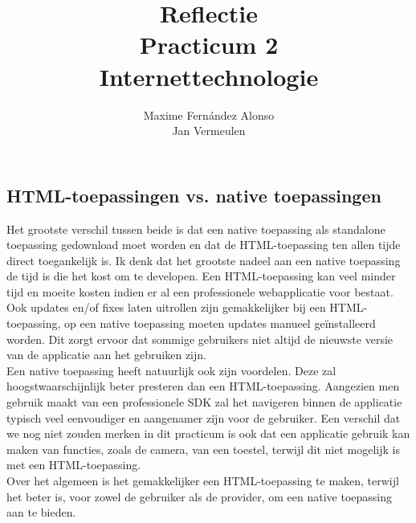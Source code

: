 \documentclass[a4paper,11pt]{article}
\begin{document}

\title{Reflectie\\Practicum 2\\Internettechnologie}
\author{Maxime Fern\'andez Alonso\\Jan Vermeulen}
\date{}
\maketitle


\subsection*{HTML-toepassingen vs. native toepassingen}
Het grootste verschil tussen beide is dat een native toepassing als standalone toepassing gedownload moet worden en dat de HTML-toepassing ten allen tijde direct toegankelijk is. Ik denk dat het grootste nadeel aan een native toepassing de tijd is die het kost om te developen. Een HTML-toepassing kan veel minder tijd en moeite kosten indien er al een professionele webapplicatie voor bestaat. Ook updates en/of fixes laten uitrollen zijn gemakkelijker bij een HTML-toepassing, op een native toepassing moeten updates manueel ge\"installeerd worden. Dit zorgt ervoor dat sommige gebruikers niet altijd de nieuwste versie van de applicatie aan het gebruiken zijn.\\
Een native toepassing heeft natuurlijk ook zijn voordelen. Deze zal hoogstwaarschijnlijk beter presteren dan een HTML-toepassing. Aangezien men gebruik maakt van een professionele SDK zal het navigeren binnen de applicatie typisch veel eenvoudiger en aangenamer zijn voor de gebruiker. Een verschil dat we nog niet zouden merken in dit practicum is ook dat een applicatie gebruik kan maken van functies, zoals de camera, van een toestel, terwijl dit niet mogelijk is met een HTML-toepassing.\\
Over het algemeen is het gemakkelijker een HTML-toepassing te maken, terwijl het beter is, voor zowel de gebruiker als de provider, om een native toepassing aan te bieden. 
\end{document}
